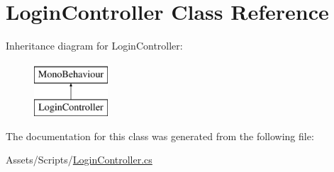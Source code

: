 \hypertarget{classLoginController}{}\section{Login\+Controller Class Reference}
\label{classLoginController}
Inheritance diagram for Login\+Controller\+:\begin{figure}[H]
\begin{center}
\leavevmode
\includegraphics[height=2.000000cm]{classLoginController}
\end{center}
\end{figure}


The documentation for this class was generated from the following file\+:\begin{DoxyCompactItemize}
\item 
Assets/\+Scripts/\hyperlink{LoginController_8cs}{Login\+Controller.\+cs}\end{DoxyCompactItemize}
